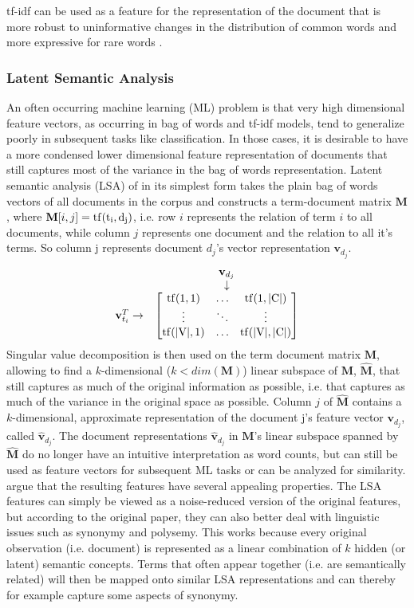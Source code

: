 tf-idf can be used as a feature for the representation of the document
that is more robust to uninformative changes in the distribution of
common words and more expressive for rare words \citep{Manning2008vect}.


\subsubsection*{Latent Semantic Analysis}

An often occurring machine learning (ML) problem is that very high dimensional
feature vectors, as occurring in bag of words and tf-idf models,
tend to generalize poorly in subsequent tasks like classification.
In those cases, it is desirable to have a more condensed lower dimensional
feature representation of documents that still captures most of the
variance in the bag of words representation. Latent semantic analysis
(LSA) of \citet{Deerwester1990} in its simplest form takes the plain bag of words
vectors of all documents in the corpus and constructs a term-document
matrix $\textbf{M}$, where $\textbf{M}[i,j]=\rm{tf}(t_{i},d_{j})$, i.e. row $i$ represents
the relation of term $i$ to all documents, while column $j$ represents
one document and the relation to all it's terms. So column j represents document $d_j$'s vector representation $\textbf{v}_{d_j}$.
\[ 
\begin{matrix} & \textbf{v}_{d_j}\\
& \downarrow\\
\textbf{v}_{t_i}^{T}\rightarrow & \begin{bmatrix}\rm{tf}(1,1) & \dots & \rm{tf}(1,|C|)\\
\vdots & \ddots & \vdots\\
\rm{tf}(|V|,1) & \dots & \rm{tf}(|V|,|C|)
\end{bmatrix}
\end{matrix}
\]
Singular value decomposition is then used on the term document matrix
$\textbf{M}$, allowing to find a $k$-dimensional ($k<dim(\textbf{M})$) linear subspace
of $\textbf{M}$, $\hat{\textbf{M}}$, that still captures as much of the original information
as possible, i.e. that captures as much of the variance in the original
space as possible. Column $j$ of $\hat{\textbf{M}}$ contains a $k$-dimensional,
approximate representation of the document j's feature vector $\textbf{v}_{d_{j}}$, called $\hat{\textbf{v}}_{d_{j}}$.
The document representations $\hat{\textbf{v}}_{d_j}$ in $\textbf{M}$'s linear subspace
spanned by $\hat{\textbf{M}}$ do no longer have an intuitive interpretation
as word counts, but can still be used as feature vectors for subsequent
ML tasks or can be analyzed for similarity. \citet{Deerwester1990} argue
that the resulting features have several appealing properties. The
LSA features can simply be viewed as a noise-reduced version of the
original features, but according to the original paper, they can also
better deal with linguistic issues such as synonymy and polysemy.
This works because every original observation (i.e. document) is represented
as a linear combination of $k$ hidden (or latent) semantic concepts.
Terms that often appear together (i.e. are semantically related) will
then be mapped onto similar LSA representations and can thereby for
example capture some aspects of synonymy.

